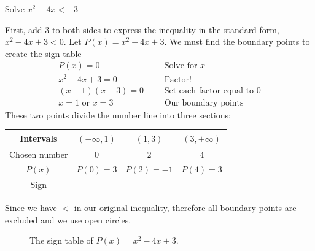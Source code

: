 \begin{exa}
    Solve $x^2-4x<-3$
\end{exa}
First, add 3 to both sides to express the inequality in the standard form, $x^2-4x+3<0$. Let $P(x) = x^2-4x+3$. We must find the boundary points to create the sign table
\begin{align*}
        P(x) = 0&       &   &\text{Solve for $x$}\\
        x^2-4x+3=0&     &   &\text{Factor!}\\
        (x-1)(x-3)=0&   &   &\text{Set each factor equal to 0}\\
        x=1 \text{ or } x=3&  &   &\text{Our boundary points}
\end{align*}
These two points divide the number line into three sections:
\begin{table}[ht]
\centering
\begin{tabular}{c || c  c  c }
    \toprule
    Intervals     & $(-\infty,1)$   & $(1,3)$  & $(3,+\infty)$\\[1.5pt]
    \hline \hline
    Chosen number & $0$         &  $2$      &   $4$ \\
    $P(x)$        & $P(0)=3$  & $P(2)=-1$ & $P(4)=3$ \\[1.5pt]
    Sign          &\circled{$+$} &\circled{$-$}&\circled{$+$}
\end{tabular}
\end{table}


Since we have $<$ in our original inequality, therefore all boundary points are excluded and we use open circles.
\begin{figure}[ht]   
    \centering
    \caption{The sign table of $P(x)=x^2-4x+3$.}
\end{figure}


